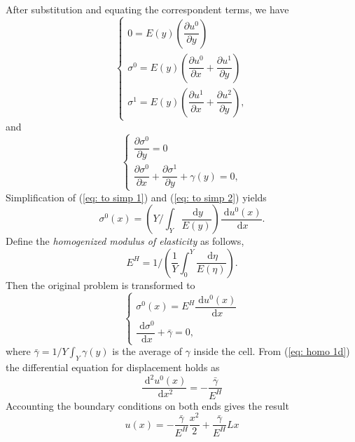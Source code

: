 \documentclass[10pt,a4paper]{scrreprt}
\newcommand{\myd}{\;\mathrm{d}}
\begin{document}
After substitution and equating the correspondent terms, we have
\begin{equation}
\label{eq: to simp 1}
\left\{
\begin{array}{l}
0 = E(y)\left( \dfrac{\partial u^{0}}{\partial y} \right) \\
\sigma^{0} = E(y) \left( \dfrac{\partial u^{0}}{\partial x} + \dfrac{\partial u^{1}}{\partial y} \right) \\
\sigma^{1} = E(y) \left( \dfrac{\partial u^{1}}{\partial x} + \dfrac{\partial u^{2}}{\partial y} \right),
\end{array}
\right.
\end{equation}
and
\begin{equation}
\label{eq: to simp 2}
\left\{
\begin{array}{l}
\dfrac{\partial \sigma^{0}}{\partial y}=0 \\
\dfrac{\partial \sigma^{0}}{\partial x} + \dfrac{\partial \sigma^{1}}{\partial y} + \gamma(y) = 0, 
\end{array}
\right.
\end{equation}
Simplification of (\ref{eq: to simp 1}) and (\ref{eq: to simp 2}) yields
\begin{equation}
\label{eq: sigma 0}
\sigma^{0}(x) = \left(Y/\int_{Y} \dfrac{\myd{y}}{E(y)} \right) \dfrac{\myd{u^{0}(x)}}{\myd{x}}.
\end{equation}
Define the \textit{homogenized modulus of elasticity} as follows,
\begin{equation}
E^{H} = 1/ \left( \dfrac{1}{Y} \int_{0}^{Y} \dfrac{\myd{\eta}}{E(\eta)}\right) .
\end{equation}
Then the original problem is transformed to
\begin{equation}
\label{eq: homo 1d}
\left\{
\begin{array}{l}
\sigma^{0}(x) = E^{H} \dfrac{\myd{u^{0}(x)}}{\myd{x}} \\
\dfrac{\myd{\sigma^{0}}}{\myd{x}} + \bar{\gamma} = 0,
\end{array}
\right.
\end{equation}
where $\bar{\gamma}=1/Y \int_{Y} \gamma(y)$ is the average of $\gamma$ inside the cell. From (\ref{eq: homo 1d}) the differential equation for displacement holds as
\begin{equation}
\dfrac{\myd^2 u^{0}(x)}{\myd{x^{2}}} = -\dfrac{\bar{\gamma}}{E^{H}}
\end{equation}
Accounting the boundary conditions on both ends gives the result
\[u(x) = -\dfrac{\bar{\gamma}}{E^{H}} \dfrac{x^{2}}{2} + \dfrac{\bar{\gamma}}{E^{H}} Lx \]
\end{document}
